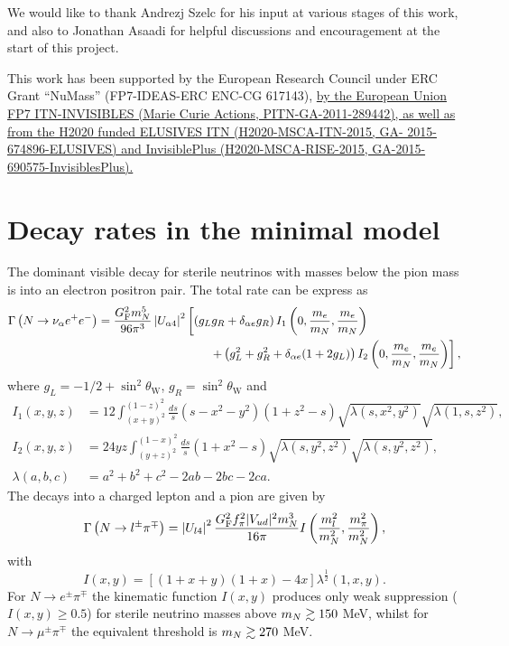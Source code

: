 \documentclass[11pt, a4paper]{article}
\def\ster{\ensuremath N}
\newcommand{\newtext}[2]{\textcolor{#1}{\ul{#2}}}
\begin{document}
\acknowledgments

We would like to thank Andrezj Szelc for his input at various stages of this
work, and also to Jonathan Asaadi for helpful discussions and encouragement at
the start of this project.

This work has been supported by the European Research Council under ERC Grant
``NuMass'' (FP7-IDEAS-ERC ENC-CG 617143), \newtext{PB}{by the European Union FP7
ITN-INVISIBLES (Marie Curie Actions, PITN-GA-2011-289442), as well as from the
H2020 funded ELUSIVES ITN (H2020-MSCA-ITN-2015, GA- 2015-674896-ELUSIVES) and 
InvisiblePlus (H2020-MSCA-RISE-2015, GA-2015-690575-InvisiblesPlus).}

\appendix

\section{\label{app:decayrates}Decay rates in the minimal model}

The dominant visible decay for sterile neutrinos with masses below the pion
mass is into an electron positron pair. The total rate can be express as
%
\begin{align*} \Gamma\left(\ster\to \nu_\alpha e^+e^-\right) =
\frac{G_\text{F}^2m_\ster^5}{96\pi^3}\left|U_{\alpha 4}\right|^2&\left[\left( g_Lg_R + \delta_{\alpha e}g_R\right)I_1\left(0,\frac{m_e}{m_\ster}, \frac{
m_e}{m_\ster}\right)\right.\\ 
&\left.\qquad + \left(g_L^2 + g_R^2 + \delta_{\alpha e}(1+2g_L)\right)I_2\left(0,\frac{m_e}{m_\ster},\frac{m_e}{m_\ster}\right)\right],  \end{align*}
%
where $g_L = -1/2 + \sin^2\theta_\text{W}$, $g_R = \sin^2\theta_\text{W}$ and
% 
\begin{align*} I_1(x,y,z) & =12 \int_{(x+y)^2}^{(1-z)^2}
\frac{ds}{s}(s-x^2-y^2)(1+z^2-s)\sqrt{\lambda(s,x^2,y^2)}\sqrt{\lambda(1,s,z^2)},\\
I_2(x,y,z)& =24yz\int_{(y+z)^2}^{(1-x)^2}\frac{ds}{s}\left(1+x^2-s\right)\sqrt{\lambda\left(s,y^2,z^2\right)}\sqrt{\lambda\left(s,y^2,z^2\right)},\\
\lambda(a,b,c) &= a^2+b^2+c^2 - 2ab-2bc-2ca.  \end{align*}
%
The decays into a charged lepton and a pion are given by 
%
\[ \Gamma\left(\ster\to l^\pm\pi^\mp\right) =
\left|U_{l4}\right|^2\frac{G_\text{F}^2f_\pi^2 |V_{ud}|^2
m_\ster^3}{16\pi}I\left(\frac{m_l^2}{m_\ster^2} ,
\frac{m_\pi^2}{m_\ster^2}\right) , \] 
%
with \[ I(x,y) = \left[ \left( 1+x+y\right) \left(1+x\right) -4 x\right]
\lambda^\frac{1}{2}\left(1,x,y\right).  \]
%
For $N\to e^\pm\pi^\mp$ the kinematic function $I(x,y)$ produces only weak suppression ($I(x,y)\geq 0.5$) for sterile  neutrino masses above $m_\ster\gtrsim 150$ MeV, whilst for $N\to
\mu^\pm\pi^\mp$ the equivalent threshold is $m_\ster\gtrsim 270$ MeV.
\end{document}
